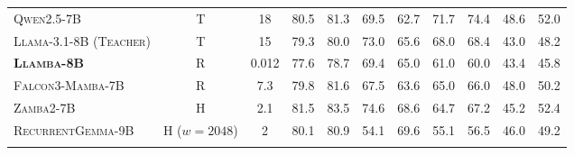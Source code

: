 \begin{table}[H]
\begin{tabular}{l c c c c c c c c c c}
        \midrule

        \textsc{Qwen2.5-7B} & T & 18 & 80.5 & 81.3 & 69.5 & 62.7 & 71.7 & 74.4 & 48.6 & 52.0 \\
        \textsc{Llama-3.1-8B (Teacher)} & T & 15          & 79.3 & 80.0 & 73.0 & 65.6 & 68.0 & 68.4 & 43.0 & 48.2 \\
        \textbf{\textsc{Llamba-8B}}      & R & 0.012       & 77.6 & 78.7 & 69.4 & 65.0 & 61.0 & 60.0 & 43.4 & 45.8 \\
        \textsc{Falcon3-Mamba-7B}       & R & 7.3         & 79.8 & 81.6 & 67.5 & 63.6 & 65.0 & 66.0 & 48.0 & 50.2 \\
        \textsc{Zamba2-7B}             & H & 2.1         & 81.5 & 83.5 & 74.6 & 68.6 & 64.7 & 67.2 & 45.2 & 52.4 \\
        \textsc{RecurrentGemma-9B}      & H ($w=2048$) & 2       & 80.1 & 80.9 & 54.1 & 69.6 & 55.1 & 56.5 & 46.0 & 49.2 \\
        \bottomrule
        \multicolumn{11}{l}{} \\
    \end{tabular}
\end{table}